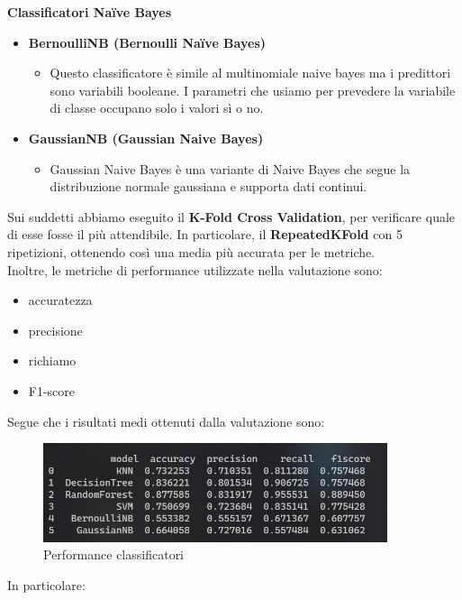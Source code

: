 \documentclass{article}
\begin{document}
\textbf{Classificatori Naïve Bayes}
\begin{itemize}
    \item \textbf{BernoulliNB (Bernoulli Naïve Bayes)}
    \begin{itemize} \item Questo classificatore è simile al multinomiale naive bayes ma i predittori sono variabili booleane. I parametri che usiamo per prevedere la variabile di classe occupano solo i valori sì o no.
    \end{itemize}
    \item \textbf{GaussianNB (Gaussian Naive Bayes)}
    \begin{itemize} \item Gaussian Naive Bayes è una variante di Naive Bayes che segue la distribuzione normale gaussiana e supporta dati continui.
    \end{itemize}
\end{itemize}
%
Sui suddetti abbiamo eseguito  il \textbf{K-Fold Cross Validation}, per verificare quale di esse fosse il più attendibile. In particolare, il \textbf{RepeatedKFold} con 5 ripetizioni, ottenendo così una media più accurata per le metriche.\\
Inoltre, le metriche di performance utilizzate nella valutazione sono:
\begin{itemize}
    \item accuratezza 
    \item precisione
    \item richiamo
    \item F1-score
\end{itemize}

Segue che i risultati medi ottenuti dalla valutazione sono:
\begin{figure}[H]
        \includegraphics[width=0.9\textwidth]{imagModel}
        \centering
        \caption{Performance classificatori}
        \centering
\end{figure}

In particolare:
\end{document}
